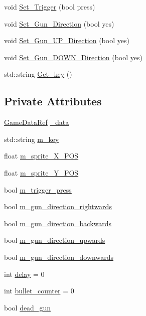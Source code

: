 \begin{DoxyCompactItemize}
\item 
void \hyperlink{classSekander_1_1Gun_aabbbbdf814ee725561dd603f0d406c22}{Set\+\_\+\+Trigger} (bool press)
\item 
void \hyperlink{classSekander_1_1Gun_ac508687c44a274755e4925abec758770}{Set\+\_\+\+Gun\+\_\+\+Direction} (bool yes)
\item 
void \hyperlink{classSekander_1_1Gun_a83f0098d0ed7748787af13f108ed5d90}{Set\+\_\+\+Gun\+\_\+\+U\+P\+\_\+\+Direction} (bool yes)
\item 
void \hyperlink{classSekander_1_1Gun_a20b0be2d3c18d28141b7480c933cd370}{Set\+\_\+\+Gun\+\_\+\+D\+O\+W\+N\+\_\+\+Direction} (bool yes)
\item 
std\+::string \hyperlink{classSekander_1_1Gun_a7d2a8fefec4e64f6c56359738d7ec7c5}{Get\+\_\+key} ()
\end{DoxyCompactItemize}
\subsection*{Private Attributes}
\begin{DoxyCompactItemize}
\item 
\hyperlink{namespaceSekander_a1d69b002ba2d23020901c28f0def5e16}{Game\+Data\+Ref} \hyperlink{classSekander_1_1Gun_a95137d634392845be958b7ce8bdfa1df}{\+\_\+data}
\item 
std\+::string \hyperlink{classSekander_1_1Gun_a810e56bc82557e745baba8ae9179fe5e}{m\+\_\+key}
\item 
float \hyperlink{classSekander_1_1Gun_a99a1490de874927b69abc0949954a7f5}{m\+\_\+sprite\+\_\+\+X\+\_\+\+P\+OS}
\item 
float \hyperlink{classSekander_1_1Gun_a792041894089eece8cdaf689260c90f1}{m\+\_\+sprite\+\_\+\+Y\+\_\+\+P\+OS}
\item 
bool \hyperlink{classSekander_1_1Gun_a6e3c2771562a84475c4d596b20388ffa}{m\+\_\+trigger\+\_\+press}
\item 
bool \hyperlink{classSekander_1_1Gun_a4f70959df2c1742c569d041a40bbc182}{m\+\_\+gun\+\_\+direction\+\_\+rightwards}
\item 
bool \hyperlink{classSekander_1_1Gun_ab8f736dba3a7a589a3f11866e190f46e}{m\+\_\+gun\+\_\+direction\+\_\+backwards}
\item 
bool \hyperlink{classSekander_1_1Gun_ac91796b5d957ca80618c363e191d5e04}{m\+\_\+gun\+\_\+direction\+\_\+upwards}
\item 
bool \hyperlink{classSekander_1_1Gun_ae45d67071fd9e59cf8d94723fb6cccc2}{m\+\_\+gun\+\_\+direction\+\_\+downwards}
\item 
int \hyperlink{classSekander_1_1Gun_a58b9c611d278ddc0b3b1b0588a405bb1}{delay} = 0
\item 
int \hyperlink{classSekander_1_1Gun_a97504b1f4030588c0bca071134d3d891}{bullet\+\_\+counter} = 0
\item 
bool \hyperlink{classSekander_1_1Gun_aed128870319529784cca7bc1d11090d2}{dead\+\_\+gun}
\end{DoxyCompactItemize}
